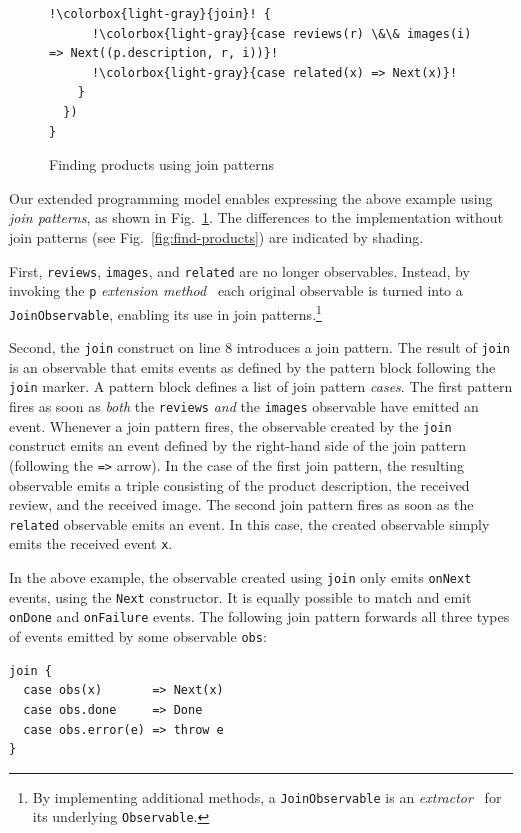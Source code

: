 \documentclass[runningheads]{llncs}
\begin{document}
\begin{sloppypar}
\begin{figure}[ht]
\begin{lstlisting}[escapechar=!]
    !\colorbox{light-gray}{join}! {
      !\colorbox{light-gray}{case reviews(r) \&\& images(i) => Next((p.description, r, i))}!
      !\colorbox{light-gray}{case related(x) => Next(x)}!
    }
  })
}
\end{lstlisting}
\caption{Finding products using join patterns}
\label{fig:find-products-joins}
\end{figure}

\noindent
Our extended programming model enables expressing the above example using {\em
join patterns}, as shown in Fig.~\ref{fig:find-products-joins}. The
differences to the implementation without join patterns (see
Fig.~\ref{fig:find-products}) are indicated by \colorbox{light-gray}{shading}.

First, \verb|reviews|, \verb|images|, and \verb|related| are no longer
observables. Instead, by invoking the \verb|p| {\em extension method}~\cite{Odersky-Spoon-Venners07}
each original observable is turned into a
\verb|JoinObservable|, enabling its use in join patterns.\footnote{By
implementing additional methods, a \texttt{JoinObservable} is an {\em
extractor}~\cite{EmirOW07} for its underlying \texttt{Observable}.}

Second, the \verb|join| construct on line 8 introduces a join pattern. The
result of \verb|join| is an observable that emits events as defined by the
pattern block following the \verb|join| marker. A pattern block defines a list
of join pattern {\em cases}. The first pattern fires as soon as {\em both} the
\verb|reviews| {\em and} the \verb|images| observable have emitted an event.
Whenever a join pattern fires, the observable created by the \verb|join|
construct emits an event defined by the right-hand side of the join pattern
(following the \verb|=>| arrow). In the case of the first join pattern, the
resulting observable emits a triple consisting of the product description, the
received review, and the received image. The second join pattern fires as soon
as the \verb|related| observable emits an event. In this case, the created
observable simply emits the received event \verb|x|.

In the above example, the observable created using \verb|join| only emits
\verb|onNext| events, using the \verb|Next| constructor. It is equally
possible to match and emit \verb|onDone| and \verb|onFailure| events. The
following join pattern forwards all three types of events emitted by some
observable \verb|obs|:

\begin{lstlisting}
join {
  case obs(x)       => Next(x)
  case obs.done     => Done
  case obs.error(e) => throw e
}
\end{lstlisting}


\end{sloppypar}
\end{document}
